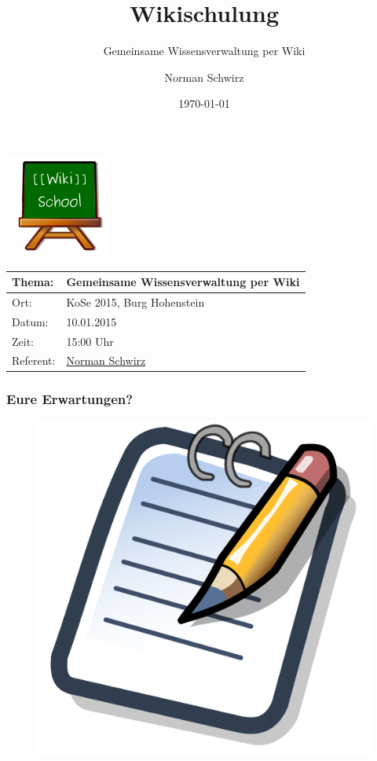 \documentclass{beamer}              %
\title{Wikischulung}
\subtitle{Gemeinsame Wissensverwaltung per Wiki}
\author{Norman Schwirz}
\institute{StuRa der HTW Dresden, Bereich Schulungen}
\date{\today}
\begin{document}
\begin{frame} %
  \begin{center}
    \includegraphics[keepaspectratio=true, scale=1]{wikischool-logo}
    \begin{longtable}{|l|l|}
      \toprule
      \textbf{Thema:} &  \textbf{Gemeinsame Wissensverwaltung per Wiki} \\
      \midrule
       Ort:           & KoSe 2015, Burg Hohenstein \\ 
       Datum:         & 10.01.2015 \\
       Zeit:          & 15:00 Uhr \\ 
       Referent:      &  \href{http://www.stura.htw-dresden.de/members/NormanSchwirz}{Norman Schwirz}  \\ 
      \bottomrule
    \end{longtable}
  \end{center}
\end{frame}


\begin{frame}
  \frametitle{Eure Erwartungen?}
  
  \begin{figure}[tbph]
    \centering
    \includegraphics[width=0.7\linewidth]{500px-Notepad_icon}
    \label{fig:500px-Notepad_icon}
  \end{figure}
  
\end{frame}
\end{document}
